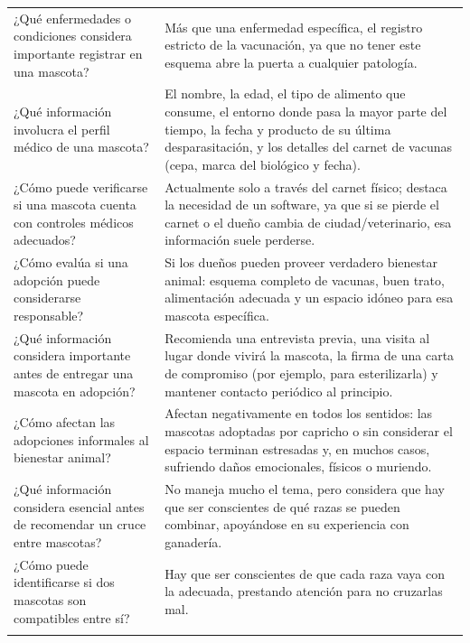 \documentclass[journal,onecolumn]{IEEEtran}
\begin{document}
{\begin{longtable}{@{}p{5.6cm} p{9.4cm}@{}}
			¿Qué enfermedades o condiciones considera importante registrar en una mascota? & Más que una enfermedad específica, el registro estricto de la vacunación, ya que no tener este esquema abre la puerta a cualquier patología. \\ \addlinespace
			
			¿Qué información involucra el perfil médico de una mascota? & El nombre, la edad, el tipo de alimento que consume, el entorno donde pasa la mayor parte del tiempo, la fecha y producto de su última desparasitación, y los detalles del carnet de vacunas (cepa, marca del biológico y fecha). \\ \addlinespace
			
			¿Cómo puede verificarse si una mascota cuenta con controles médicos adecuados? & Actualmente solo a través del carnet físico; destaca la necesidad de un software, ya que si se pierde el carnet o el dueño cambia de ciudad/veterinario, esa información suele perderse. \\ \addlinespace
			
			¿Cómo evalúa si una adopción puede considerarse responsable? & Si los dueños pueden proveer verdadero bienestar animal: esquema completo de vacunas, buen trato, alimentación adecuada y un espacio idóneo para esa mascota específica. \\ \addlinespace
			
			¿Qué información considera importante antes de entregar una mascota en adopción? & Recomienda una entrevista previa, una visita al lugar donde vivirá la mascota, la firma de una carta de compromiso (por ejemplo, para esterilizarla) y mantener contacto periódico al principio. \\ \addlinespace
			
			¿Cómo afectan las adopciones informales al bienestar animal? & Afectan negativamente en todos los sentidos: las mascotas adoptadas por capricho o sin considerar el espacio terminan estresadas y, en muchos casos, sufriendo daños emocionales, físicos o muriendo. \\ \addlinespace
			
			¿Qué información considera esencial antes de recomendar un cruce entre mascotas? & No maneja mucho el tema, pero considera que hay que ser conscientes de qué razas se pueden combinar, apoyándose en su experiencia con ganadería. \\ \addlinespace
			
			¿Cómo puede identificarse si dos mascotas son compatibles entre sí? & Hay que ser conscientes de que cada raza vaya con la adecuada, prestando atención para no cruzarlas mal. \\ \addlinespace
			

\end{longtable}}
\end{document}
